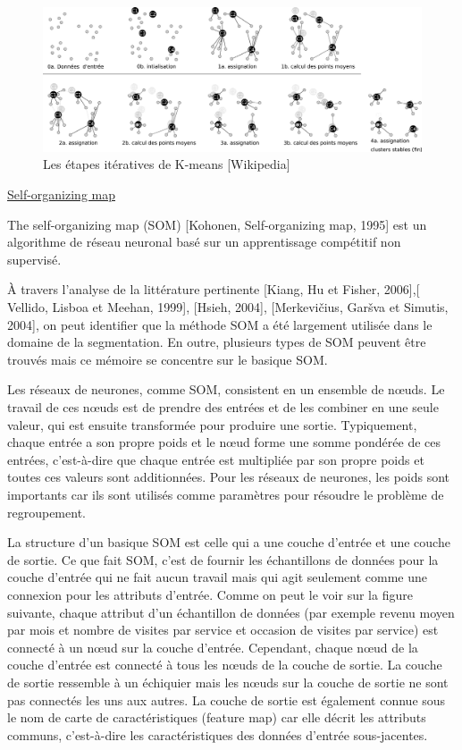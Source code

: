 \documentclass[12pt]{article}
\begin{document}
{%

\begin{figure}[H]
	\centering
    \includegraphics[width=1\textwidth]{image8.png}
     \caption{Les étapes itératives de K-means [Wikipedia]}
    \label{fig:8}
\end{figure}

\underline{Self-organizing map}

The self-organizing map (SOM) {\color{red}[Kohonen, Self-organizing map, 1995]} est un algorithme de réseau neuronal basé sur un apprentissage compétitif non supervisé.

À travers l'analyse de la littérature pertinente {\color{red}[Kiang, Hu et Fisher, 2006]},{\color{red}[ Vellido, Lisboa et Meehan, 1999]}, {\color{red}[Hsieh, 2004]}, {\color{red}[Merkevičius, Garšva et Simutis, 2004]}, on peut identifier que la méthode SOM a été largement utilisée dans le domaine de la segmentation. 
En outre, plusieurs types de SOM peuvent être trouvés mais ce mémoire se concentre sur le basique SOM.

Les réseaux de neurones, comme SOM, consistent en un ensemble de nœuds. Le travail de ces nœuds est de prendre des entrées et de les combiner en une seule valeur, qui est ensuite transformée pour produire une sortie. Typiquement, chaque entrée a son propre poids et le nœud forme une somme pondérée de ces entrées, c'est-à-dire que chaque entrée est multipliée par son propre poids et toutes ces valeurs sont additionnées. Pour les réseaux de neurones, les poids sont importants car ils sont utilisés comme paramètres pour résoudre le problème de regroupement.

La structure d'un basique SOM est celle qui a une couche d'entrée et une couche de sortie. Ce que fait SOM, c'est de fournir les échantillons de données pour la couche d'entrée qui ne fait aucun travail mais qui agit seulement comme une connexion pour les attributs d'entrée. Comme on peut le voir sur la figure suivante, chaque attribut d'un échantillon de données (par exemple revenu moyen par mois et nombre de visites par service et occasion de visites par service) est connecté à un nœud sur la couche d'entrée. Cependant, chaque nœud de la couche d'entrée est connecté à tous les nœuds de la couche de sortie. La couche de sortie ressemble à un échiquier mais les nœuds sur la couche de sortie ne sont pas connectés les uns aux autres. La couche de sortie est également connue sous le nom de carte de caractéristiques (feature map) car elle décrit les attributs communs, c'est-à-dire les caractéristiques des données d'entrée sous-jacentes.

}
\end{document}
